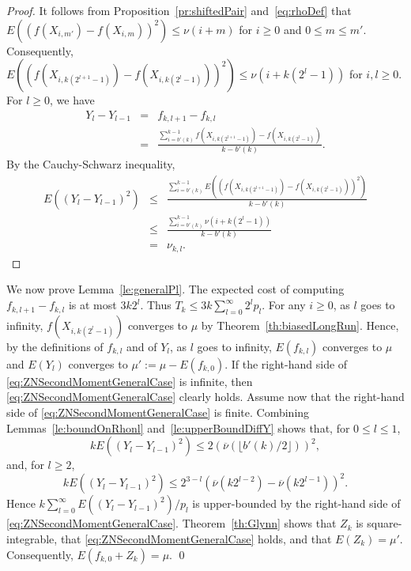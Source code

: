 \documentclass[a4paper,11pt]{article}
\begin{document}
\begin{proof}
It follows from Proposition~\ref{pr:shiftedPair} and~\eqref{eq:rhoDef} that \(E((f(X_{i,m'})-f(X_{i,m}))^{2})\leq\nu(i+m)\)  for \(i\geq0\) and \(0\leq m\leq m'\). Consequently,         \(E((f(X_{i,k(2^{l+1}-1)})-f(X_{i,k(2^{l}-1)}))^{2})\leq\nu(i+k(2^{l}-1))\) for  \(i,l\geq0\). For \(l\geq0\), we have\begin{eqnarray*}
Y_{l}-Y_{l-1}&=&f_{k,l+1}-f_{k,l}\\
&=&\frac{\sum ^{k-1}_{i=b'(k)}f(X_{i,k(2^{l+1}-1)})-f(X_{i,k(2^{l}-1)})}{k-b'(k)}. \end{eqnarray*}By the Cauchy-Schwarz inequality, \begin{eqnarray*}
E((Y_{l}-Y_{l-1})^{2})&\le&\frac{\sum ^{k-1}_{i=b'(k)}E((f(X_{i,k(2^{l+1}-1)})-f(X_{i,k(2^{l}-1)}))^{2})}{k-b'(k)}\\ &\le&\frac{\sum ^{k-1}_{i=b'(k)}\nu(i+k(2^{l}-1))}{k-b'(k)}\\
&=&\nu_{k,l}.
\end{eqnarray*}
\end{proof}
We now prove Lemma~\ref{le:generalPl}. The expected cost of computing  \(f_{k,l+1}-f_{k,l}\) is at most  \(3k2^{l}\). Thus  \(T_{k}\le3k\sum^{\infty}_{l=0}2^{l}p_{l}\).
 For any \(i\geq0\), as \(l\) goes to infinity, \(f(X_{i,k(2^{l}-1)})\) converges to \(\mu\) by Theorem~\ref{th:biasedLongRun}. Hence, by the definitions of \(f_{k,l}\) and of \(Y_{l}\), as \(l\) goes to infinity, \(E(f_{k,l})\) converges to \(\mu\) and \(E(Y_l)\) converges to \(\mu':=\mu-E(f_{k,0})\).  
If the right-hand side of \eqref{eq:ZNSecondMomentGeneralCase} is infinite, then  \eqref{eq:ZNSecondMomentGeneralCase} clearly holds. Assume now that the right-hand side of \eqref{eq:ZNSecondMomentGeneralCase} is finite.   Combining  Lemmas~\ref{le:boundOnRhonl} and~\ref{le:upperBoundDiffY} shows that, for \(0\leq l\leq1\),  \begin{equation*}
kE((Y_{l}-Y_{l-1})^{2})\leq 2(\overline{\nu}(\lfloor{b'(k)}/{2}\rfloor))^{2},
\end{equation*}
and, for \(l\geq2\),
\begin{equation*}
kE((Y_{l}-Y_{l-1})^{2})\le2^{3-l}(\overline{\nu}(k2^{l-2})-\overline{\nu}(k2^{l-1}))^{2}.
\end{equation*}
Hence
\(k\sum^{\infty}_{l=0}{E((Y_{l}-Y_{l-1})^{2})}/{p_{l}}\) is upper-bounded by the right-hand side of \eqref{eq:ZNSecondMomentGeneralCase}. 
 Theorem~\ref{th:Glynn}   shows that \(Z_{k}\) is square-integrable, that \eqref{eq:ZNSecondMomentGeneralCase} holds, and that \(E(Z_{k})=\mu'\). Consequently, \(E(f_{k,0} + Z_k) = \mu\).
\qed
\end{document}
